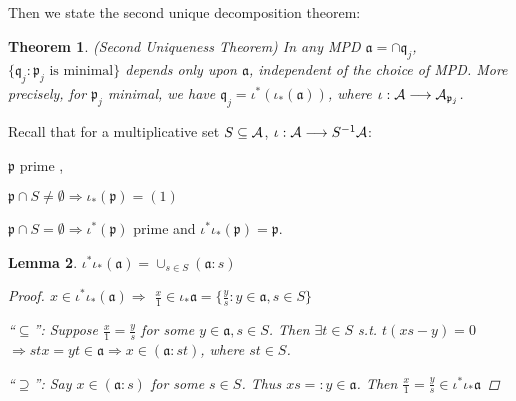 \documentclass[11pt]{article}
\newtheorem{thm}{Theorem}[section]
\newtheorem{lemma}[thm]{Lemma}
\newcommand{\sca}{{\mathfrak a}}
\newcommand{\scp}{{\mathfrak p}}
\newcommand{\scq}{\mathfrak q}
\newcommand{\cala}{{\cal A}}
\newcommand{\Lrta}{\Longrightarrow}
\newcommand{\lrta}{\longrightarrow}
\begin{document}
Then we state the second unique decomposition theorem:
\begin{thm}\label{thm:secon_unique_decomposition}(Second Uniqueness Theorem)
In any MPD $\sca=\cap \scq_j$, $\{\scq_j:\scp_j\text{ is minimal}\}$ depends only upon $\sca$, independent of the choice of MPD. More precisely, for $\scp_j$ minimal, we have $\scq_j=\iota^*(\iota_*(\sca))$, where $\iota:\cala\lrta \cala_{\scp_j}$.
\end{thm}
Recall that for a multiplicative set $S\subseteq \cala$, $\iota:\cala\lrta S^{-1}\cala$:

$\scp$ prime ,

$\scp\cap S\neq\emptyset\Lrta \iota_*(\scp)=(1)$

$\scp\cap S=\emptyset\Lrta \iota^*(\scp)$ prime and $\iota^*\iota_*(\scp)=\scp$.

\begin{lemma}
$\iota^*\iota_*(\sca)=\cup_{s\in S}(\sca:s)$
\begin{proof}
$x\in \iota^*\iota_*(\sca)\Lrta $ $\frac{x}{1}\in\iota_*\sca=\{\frac{y}{s}:y\in\sca,s\in S\}$

``$\subseteq$'': Suppose $\frac{x}{1}=\frac{y}{s}$ for some $y\in\sca,s\in S$. Then $\exists t\in S$ s.t. $t(xs-y)=0$ $\Lrta stx=yt \in \sca\Lrta x\in (\sca:st)$, where $st\in S$.

``$\supseteq$'': Say $x\in (\sca:s)$ for some $s\in S$. Thus $xs=:y \in\sca$. Then $\frac{x}{1}=\frac{y}{s}\in \iota^*\iota_*\sca$ 
\end{proof}
\end{lemma}
\end{document}
